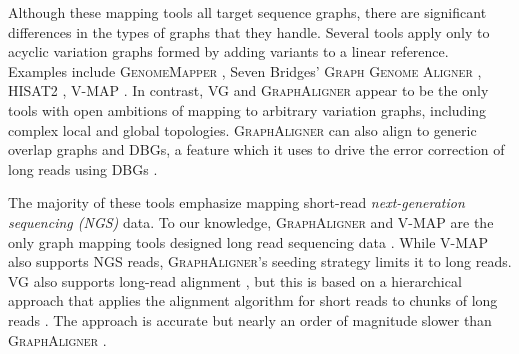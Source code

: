 Although these mapping tools all target sequence graphs, there are significant differences in the types of graphs that they handle.
Several tools apply only to acyclic variation graphs formed by adding variants to a linear reference.
Examples include \textsc{GenomeMapper} \cite{Schneeberger_2009}, Seven Bridges' \textsc{Graph Genome Aligner} \cite{Rakocevic_2019}, \textsc{HISAT2} \cite{Kim_2019}, \textsc{V-MAP} \cite{Vaddadi_2019}.
In contrast, \textsc{VG} \cite{Garrison_2019} and \textsc{GraphAligner} \cite{Rautiainen_2019b} appear to be the only tools with open ambitions of mapping to arbitrary variation graphs, including complex local and global topologies.
\textsc{GraphAligner} can also align to generic overlap graphs and DBGs, a feature which it uses to drive the error correction of long reads using DBGs \cite{Heydari_2018, Fu2019ErrorCorrectionSurvey}.

The majority of these tools emphasize mapping short-read \emph{next-generation sequencing (NGS)} data. 
To our knowledge, \textsc{GraphAligner} and \textsc{V-MAP} are the only graph mapping tools designed long read sequencing data \cite{Rautiainen_2019b, Vaddadi_2019}.
While \textsc{V-MAP} also supports NGS reads, \textsc{GraphAligner}'s seeding strategy limits it to long reads.
\textsc{VG} also supports long-read alignment \cite{Garrison_2018}, but this is based on a hierarchical approach that applies the alignment algorithm for short reads to chunks of long reads \cite{Garrison_2019}.
The approach is accurate but nearly an order of magnitude slower than \textsc{GraphAligner} \cite{Rautiainen_2019b}.

